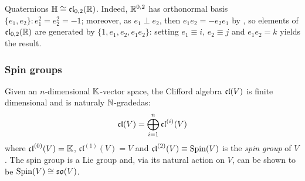 \begin{example}{Quaternions}{}
  $ \mathbb{H} \cong \mathfrak{cl}_{0,2}(\mathbb{R}) $. Indeed, $ \mathbb{R}^{0,2} $ has orthonormal basis $ \{e_1,e_2\} : e_1^2 = e_2^2 = - \mathit{1} $; moreover, as $ e_1 \perp e_2 $, then $ e_1 e_2 = - e_2 e_1 $ by , so elements of $ \mathfrak{cl}_{0,2}(\mathbb{R}) $ are generated by $ \{\mathit{1},e_1,e_2,e_1 e_2\} $: setting $ e_1 \equiv i $, $ e_2 \equiv j $ and $ e_1 e_2 = k $ yields the result.
\end{example}

\subsubsection{Spin groups}
\label{subsubsec:spin-groups}

Given an $ n $-dimensional $ \mathbb{K} $-vector space, the Clifford algebra $ \mathfrak{cl}(V) $ is finite dimensional and is naturaly $ \mathbb{N} $-graded\footnotemark as:
\begin{equation}
  \mathfrak{cl}(V) = \bigoplus_{i = 1}^n \mathfrak{cl}^{(i)}(V)
  \label{eq:cliff-alg-grade}
\end{equation}
where $ \mathfrak{cl}^{(0)}(V) = \mathbb{K} $, $ \mathfrak{cl}^{(1)}(V) = V $ and $ \mathfrak{cl}^{(2)}(V) \equiv \operatorname{Spin}(V) $ is the \textit{spin group} of $ V $. The spin group is a Lie group and, via its natural action on $ V $, can be shown to be $ \operatorname{Spin}(V) \cong \mathfrak{so}(V) $.

